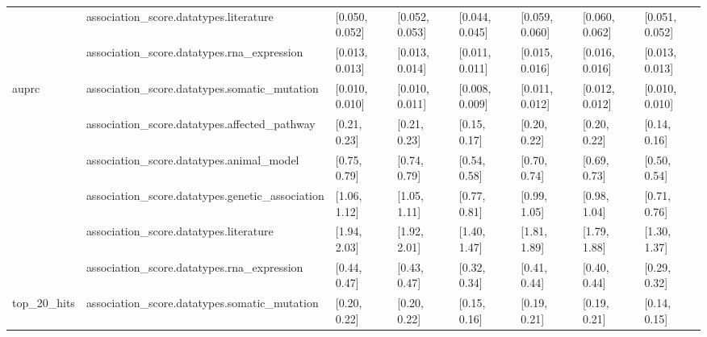 \begin{table}[H]
{\begin{tabular}{llllllll}
 & association\_score.datatypes.literature & [0.050, 0.052] & [0.052, 0.053] & [0.044, 0.045] & [0.059, 0.060] & [0.060, 0.062] & [0.051, 0.052]\\

 & association\_score.datatypes.rna\_expression & [0.013, 0.013] & [0.013, 0.014] & [0.011, 0.011] & [0.015, 0.016] & [0.016, 0.016] & [0.013, 0.013]\\

\multirow{-6}{*}{\raggedright\arraybackslash auprc} & association\_score.datatypes.somatic\_mutation & [0.010, 0.010] & [0.010, 0.011] & [0.008, 0.009] & [0.011, 0.012] & [0.012, 0.012] & [0.010, 0.010]\\
\cmidrule{1-8}
 & association\_score.datatypes.affected\_pathway & [0.21, 0.23] & [0.21, 0.23] & [0.15, 0.17] & [0.20, 0.22] & [0.20, 0.22] & [0.14, 0.16]\\

 & association\_score.datatypes.animal\_model & [0.75, 0.79] & [0.74, 0.79] & [0.54, 0.58] & [0.70, 0.74] & [0.69, 0.73] & [0.50, 0.54]\\

 & association\_score.datatypes.genetic\_association & [1.06, 1.12] & [1.05, 1.11] & [0.77, 0.81] & [0.99, 1.05] & [0.98, 1.04] & [0.71, 0.76]\\

 & association\_score.datatypes.literature & [1.94, 2.03] & [1.92, 2.01] & [1.40, 1.47] & [1.81, 1.89] & [1.79, 1.88] & [1.30, 1.37]\\

 & association\_score.datatypes.rna\_expression & [0.44, 0.47] & [0.43, 0.47] & [0.32, 0.34] & [0.41, 0.44] & [0.40, 0.44] & [0.29, 0.32]\\

\multirow{-6}{*}{\raggedright\arraybackslash top\_20\_hits} & association\_score.datatypes.somatic\_mutation & [0.20, 0.22] & [0.20, 0.22] & [0.15, 0.16] & [0.19, 0.21] & [0.19, 0.21] & [0.14, 0.15]\\
\bottomrule
\end{tabular}}
\end{table}
